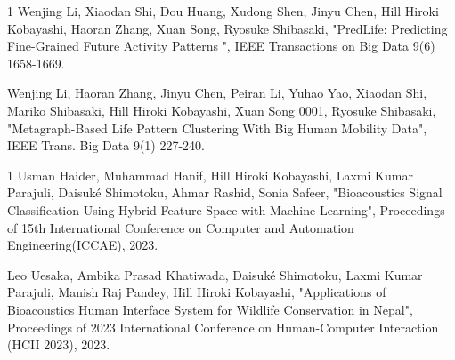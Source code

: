  \begin{雑誌論文}{1}
 Wenjing Li, Xiaodan Shi, Dou Huang, Xudong Shen, Jinyu Chen, Hill Hiroki Kobayashi, Haoran Zhang, Xuan Song, Ryosuke Shibasaki,  "PredLife: Predicting Fine-Grained Future Activity Patterns ", IEEE Transactions on Big Data 9(6) 1658-1669.

 Wenjing Li, Haoran Zhang, Jinyu Chen, Peiran Li, Yuhao Yao, Xiaodan Shi, Mariko Shibasaki, Hill Hiroki Kobayashi, Xuan Song 0001, Ryosuke Shibasaki,  "Metagraph-Based Life Pattern Clustering With Big Human Mobility Data", IEEE Trans. Big Data 9(1) 227-240.
 
 \end{雑誌論文}

 \begin{査読付}{1}
 Usman Haider, Muhammad Hanif, Hill Hiroki Kobayashi, Laxmi Kumar Parajuli, Daisuké Shimotoku, Ahmar Rashid, Sonia Safeer, "Bioacoustics Signal Classification Using Hybrid Feature Space with Machine Learning", Proceedings of 15th International Conference on Computer and Automation Engineering(ICCAE), 2023.  

 Leo Uesaka, Ambika Prasad Khatiwada, Daisuk\'e Shimotoku, Laxmi Kumar Parajuli, Manish Raj Pandey, Hill Hiroki Kobayashi, "Applications of Bioacoustics Human Interface System for Wildlife Conservation in Nepal", Proceedings of 2023 International Conference on Human-Computer Interaction (HCII 2023), 2023.  

 \end{査読付}

